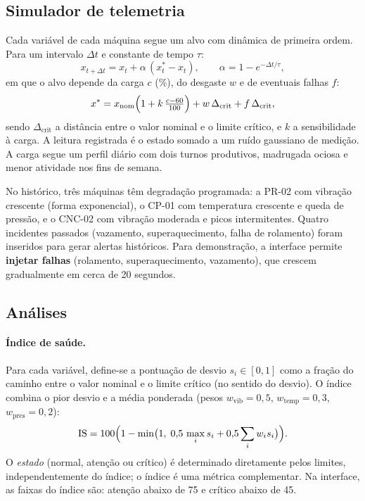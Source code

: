 \documentclass[12pt,a4paper]{article}
\begin{document}
\subsection{Simulador de telemetria}
Cada variável de cada máquina segue um alvo com dinâmica de primeira ordem. Para um intervalo $\Delta t$ e constante de tempo $\tau$:
\begin{equation}
x_{t+\Delta t} = x_t + \alpha\,(x^{*}_t - x_t),\qquad \alpha = 1 - e^{-\Delta t/\tau},
\end{equation}
em que o alvo depende da carga $c$ (\%), do desgaste $w$ e de eventuais falhas $f$:
\begin{equation}
x^{*} = x_{\text{nom}}\Bigl(1 + k\,\tfrac{c-60}{100}\Bigr) + w\,\Delta_{\text{crit}} + f\,\Delta_{\text{crit}},
\end{equation}
sendo $\Delta_{\text{crit}}$ a distância entre o valor nominal e o limite crítico, e $k$ a sensibilidade à carga. A leitura registrada é o estado
somado a um ruído gaussiano de medição. A carga segue um perfil diário com dois turnos produtivos, madrugada ociosa e menor atividade nos fins de semana.

No histórico, três máquinas têm degradação programada: a PR-02 com vibração crescente (forma exponencial), o CP-01 com temperatura crescente e queda
de pressão, e o CNC-02 com vibração moderada e picos intermitentes. Quatro incidentes passados (vazamento, superaquecimento, falha de rolamento) foram
inseridos para gerar alertas históricos. Para demonstração, a interface permite \textbf{injetar falhas} (rolamento, superaquecimento, vazamento), que
crescem gradualmente em cerca de 20 segundos.

\subsection{Análises}
\paragraph{Índice de saúde.} Para cada variável, define-se a pontuação de desvio $s_i\in[0,1]$ como a fração do caminho entre o valor nominal e o limite
crítico (no sentido do desvio). O índice combina o pior desvio e a média ponderada (pesos $w_{\text{vib}}=0{,}5$, $w_{\text{temp}}=0{,}3$, $w_{\text{pres}}=0{,}2$):
\begin{equation}
\mathrm{IS} = 100\Bigl(1 - \min\bigl(1,\;0{,}5\,\max_i s_i + 0{,}5\sum_i w_i s_i\bigr)\Bigr).
\end{equation}
O \emph{estado} (normal, atenção ou crítico) é determinado diretamente pelos limites, independentemente do índice; o índice é uma métrica complementar.
Na interface, as faixas do índice são: atenção abaixo de 75 e crítico abaixo de 45.
\end{document}

